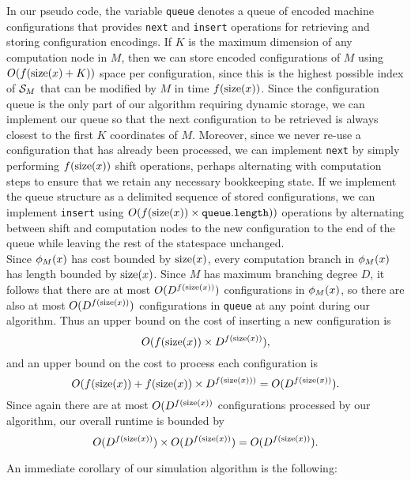 {In our pseudo code, the variable \texttt{queue} denotes
a queue of encoded machine configurations that provides \texttt{next}
and \texttt{insert} operations for retrieving and storing
configuration encodings. If $K$ is the maximum dimension of any
computation node in $M$, then we can store encoded configurations of
$M$ using $O(f(\text{size}(x) + K))$ space per configuration, since this is
the highest possible index of $\mathcal{S}_M$ that can be modified by
$M$ in time $f(\text{size}(x))$.  Since the configuration queue is the only
part of our algorithm requiring dynamic storage, we can implement our
queue so that the next configuration to be retrieved is always closest
to the first $K$ coordinates of $M$.  Moreover, since we never re-use
a configuration that has already been processed, we can implement
\texttt{next} by simply performing $f(\text{size}(x))$ shift operations,
perhaps alternating with computation steps to ensure that we retain
any necessary bookkeeping state.  If we implement the queue structure
as a delimited sequence of stored configurations, we can implement
\texttt{insert} using $O(f(\text{size}(x)) \times \mathtt{queue.length}))$
operations by alternating between shift and computation nodes to the
new configuration to the end of the queue while leaving the rest of
the statespace unchanged.\\

Since $\phi_M(x)$ has cost bounded by $\text{size}(x)$, every
computation branch in $\phi_M(x)$ has length bounded by
$\text{size}(x)$. Since $M$ has maximum branching degree $D$, it follows
that there are at most $O(D^{f(\text{size}(x))})$ configurations in
$\phi_M(x)$, so there are also at most $O(D^{f(\text{size}(x))})$
configurations in \texttt{queue} at any point during our algorithm.
Thus an upper bound on the cost of inserting a new configuration is
$$O(f(\text{size}(x)) \times D^{f(\text{size}(x))}),$$ 
and an upper bound on the cost to process each configuration is
$$O(f(\text{size}(x)) + f(\text{size}(x)) \times D^{f(\text{size}(x)))} = O(D^{f(\text{size}(x))}).$$
Since again there are at most $O(D^{f(\text{size}(x))}$ configurations
processed by our algorithm, our overall runtime is bounded by
$$O(D^{f(\text{size}(x))}) \times O(D^{f(\text{size}(x))}) = O(D^{f(\text{size}(x))}).$$

An immediate corollary of our simulation algorithm is the following:


\vspace{\baselineskip}

}
